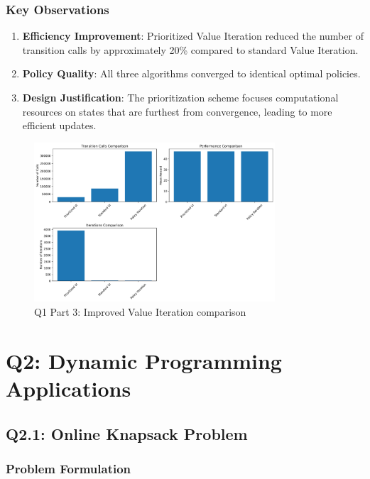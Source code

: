 \documentclass[10pt,a4paper]{article}
\begin{document}
\subsubsection{Key Observations}

\begin{enumerate}
    \item \textbf{Efficiency Improvement}: Prioritized Value Iteration reduced the number of transition calls by approximately 20\% compared to standard Value Iteration.
    
    \item \textbf{Policy Quality}: All three algorithms converged to identical optimal policies.
    
    \item \textbf{Design Justification}: The prioritization scheme focuses computational resources on states that are furthest from convergence, leading to more efficient updates.
\end{enumerate}

\begin{figure}[H]
\centering
\includegraphics[width=0.8\textwidth]{../Q1/part3/q1_part3_results.png}
\caption{Q1 Part 3: Improved Value Iteration comparison}
\end{figure}

\clearpage
\section{Q2: Dynamic Programming Applications}

\subsection{Q2.1: Online Knapsack Problem}

\subsubsection{Problem Formulation}
\end{document}
